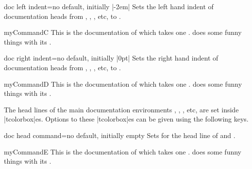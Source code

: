 \begin{docTcbKey}{doc left indent}{=}{no default, initially |-2em|}
  Sets the left hand indent of documentation heads from
  , , , etc, to .
\begin{dispExample}
\begin{docCommand*}[doc left indent=2cm]{myCommandC}{}
  This is the documentation of  which takes one .
   does some funny things with its .
\end{docCommand*}
\end{dispExample}
\end{docTcbKey}

\enlargethispage*{10mm}
\begin{docTcbKey}{doc right indent}{=}{no default, initially |0pt|}
  Sets the right hand indent of documentation heads from
  , , , etc, to .
\begin{dispExample}
\begin{docCommand*}[doc right indent=-10mm,doc right=10mm,
    doc description=test value]{myCommandD}{}
  This is the documentation of  which takes one .
   does some funny things with its .
\end{docCommand*}
\end{dispExample}
\end{docTcbKey}

\clearpage
The head lines of the main documentation environments ,
, , etc, are set inside |tcolorbox|es.
Options to these |tcolorbox|es can be given using the following keys.

\begin{docTcbKey}{doc head command}{=}{no default, initially empty}
  Sets  for the head line of  and .
\begin{dispExample}

\begin{docCommand*}{myCommandE}{}
  This is the documentation of  which takes one .
   does some funny things with its .
\end{docCommand*}
\end{dispExample}
\end{docTcbKey}

